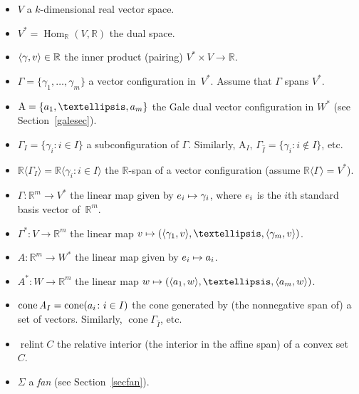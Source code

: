 \documentclass[a4paper]{amsart}
\theoremstyle{definition}
\theoremstyle{remark}
\numberwithin{equation}{section}
\def\R{\mathbb R}
\def\R{\mathbb R}
\newcommand{\mb}[1]{{\textbf {\textit#1}}}
\def\Hom{\mathop{\mathrm{Hom}}}
\def\cone{\mathop{\mathrm{cone}}}
\def\relint{\mathop{\mathrm{relint}}}
\newcommand{\<}{\langle}
\renewcommand{\>}{\rangle}
\begin{document}
\begin{itemize}
\item
$V$ a $k$-dimensional real vector space.

\item
$V^*=\Hom_\R(V,\R)$ the dual space.

\item
$\langle\gamma,\mb v\rangle\in\R$ the inner product (pairing) $V^*\times V\to\R$.

\item
$\Gamma=\{\gamma_1,\ldots,\gamma_m\}$ a vector configuration in~$V^*$. Assume that $\Gamma$ spans $V^*$.

\item
$\mathrm A=\{\mb a_1,\ldots,\mb a_m\}$ the Gale dual vector configuration in $W^*$ (see Section~\ref{galesec}).

\item
$\Gamma_I=\{\gamma_i\colon i\in I\}$ a subconfiguration of $\Gamma$. Similarly, 
$\mathrm A_I$, $\Gamma_{\widehat I}=\{\gamma_i\colon i\notin I\}$, etc.

\item
$\R\langle\Gamma_I\rangle=\R\langle\gamma_i\colon i\in I\rangle$ the $\R$-span of a vector configuration (assume $\R\langle\Gamma\rangle=V^*$).

\item $\varGamma\colon\R^m\to V^*$ the linear map given by $\mb e_i\mapsto\gamma_i$, where $\mb e_i$ is the $i$th standard basis vector of~$\R^m$.

\item $\varGamma^*\colon V\to\R^m$ the linear map $\mb v\mapsto
(\langle\gamma_1,\mb v\rangle,\ldots,\langle\gamma_m,\mb v\rangle)$.

\item $\mathit A\colon\R^m\to W^*$ the linear map given by $\mb e_i\mapsto\mb a_i$.

\item $\mathit A^*\colon W\to\R^m$ the linear map $\mb w\mapsto
(\langle\mb a_1,\mb w\rangle,\ldots,\langle\mb a_m,\mb w\rangle)$.  

\item
$\cone\mathit A_I=\cone(\mb a_i\colon i\in I)$  the cone generated by (the nonnegative span of) a set of vectors. Similarly, $\cone\Gamma_{\widehat I}$, etc.

\item
$\relint C$ the relative interior (the interior in the affine span) of a convex set~$C$.

\item
$\Sigma$ a \emph{fan} (see Section~\ref{secfan}).


\end{itemize}
\end{document}
